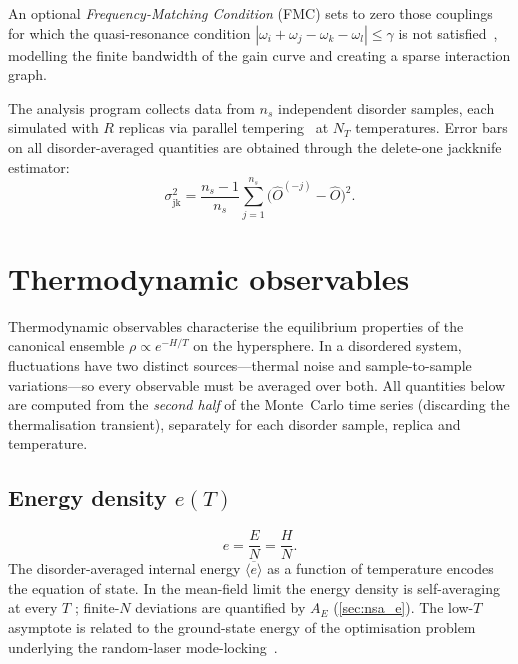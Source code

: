 \documentclass[11pt,a4paper]{article}
\newcommand{\avg}[1]{\langle #1 \rangle}
\newcommand{\avgJ}[1]{\overline{#1}}
\begin{document}
An optional \emph{Frequency-Matching Condition} (FMC) sets to zero
those couplings for which the quasi-resonance condition
$|\omega_i + \omega_j - \omega_k - \omega_l| \le \gamma$
is not
satisfied~\cite{Antenucci2015a,Antenucci2015b}, modelling the
finite bandwidth of the gain curve and creating a sparse interaction
graph.

The analysis program collects data from $n_s$ independent
disorder samples, each simulated with $R$ replicas via parallel
tempering~\cite{HukushimaNemoto1996} at $N_T$ temperatures.
Error bars on all disorder-averaged quantities are obtained
through the delete-one jackknife estimator:
\begin{equation}\label{eq:jk}
  \sigma_{\mathrm{jk}}^2
  = \frac{n_s - 1}{n_s}\sum_{j=1}^{n_s}
    \bigl(\hat{O}^{(-j)} - \hat{O}\bigr)^2.
\end{equation}

\section{Thermodynamic observables}

Thermodynamic observables characterise the equilibrium properties
of the canonical ensemble $\rho \propto e^{-H/T}$ on the
hypersphere.  In a disordered system, fluctuations have two distinct
sources---thermal noise and sample-to-sample variations---so every
observable must be averaged over both.
All quantities below are computed from the \emph{second half} of the
Monte~Carlo time series (discarding the thermalisation transient),
separately for each disorder sample, replica and temperature.

\subsection{Energy density $e(T)$}
\begin{equation}
  e = \frac{E}{N} = \frac{H}{N}.
\end{equation}
The disorder-averaged internal energy $\avgJ{\avg{e}}$ as a function
of temperature encodes the equation of state.  In the mean-field
limit the energy density is self-averaging at every $T$
\cite{MPV1987}; finite-$N$ deviations are quantified by $A_E$
(\cref{sec:nsa_e}).  The low-$T$ asymptote is related to the
ground-state energy of the optimisation problem underlying the
random-laser mode-locking~\cite{Antenucci2015a}.
\end{document}
